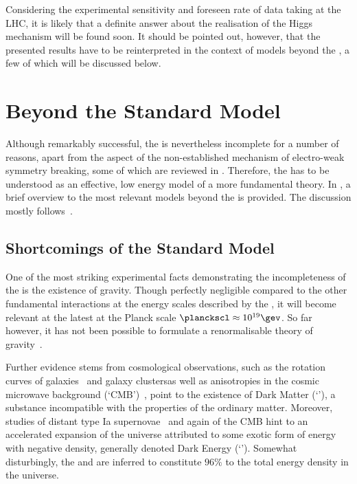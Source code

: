 Considering the experimental sensitivity and foreseen rate of data taking at the LHC, it is likely that a definite answer about the realisation of the \sm Higgs mechanism will be found soon.
It should be pointed out, however, that the presented results have to be reinterpreted in the context of models beyond the \sm, a few of which will be discussed below.



\section{Beyond the Standard Model} \label{sec:Theory:BeyondSM}
Although remarkably successful, the \sm is nevertheless incomplete for a number of reasons, apart from the aspect of the non-established mechanism of electro-weak symmetry breaking, some of which are reviewed in .
Therefore, the \sm has to be understood as an effective, low energy model of a more fundamental theory.
In , a brief overview to the most relevant models beyond the \sm is provided.
The discussion mostly follows~\cite{bib:BaerTata:WeakScaleSusy}.


\subsection{Shortcomings of the Standard Model} \label{sec:Theory:SMShortcomings}
One of the most striking experimental facts demonstrating the incompleteness of the \sm is the existence of gravity.
Though perfectly negligible compared to the other fundamental interactions at the energy scales described by the \sm, it will become relevant at the latest at the Planck scale \mbox{$\planckscl\approx10^{19}\gev$}.
So far however, it has not been possible to formulate a renormalisable theory of gravity~\cite{bib:FeynmanLectures:Gravity}.

Further evidence stems from cosmological observations, such as the rotation curves of galaxies~\cite{1959BAN....14..323V} and galaxy clusters\addref as well as anisotropies in the cosmic microwave background (`CMB')~\cite{Jarosik:2010iu,Komatsu:2010fb}, point to the existence of Dark Matter (`\dm'), a substance incompatible with the properties of the ordinary \sm matter.
Moreover, studies of distant type Ia supernovae~\cite{Riess:1998cb,Perlmutter:1998np} and again of the CMB hint to an accelerated expansion of the universe attributed to some exotic form of energy with negative density, generally denoted Dark Energy (`\de').
Somewhat disturbingly, the \dm and \de are inferred to constitute $96\%$ to the total energy density in the universe.

